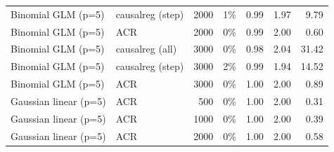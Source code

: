\begin{tabular}{llrrrrr}
Binomial GLM (p=5) & causalreg (step) & 2000 & 1\% & 0.99 & 1.97 & 9.79 \\
Binomial GLM (p=5) & ACR & 2000 & 0\% & 0.99 & 2.00 & 0.60 \\
Binomial GLM (p=5) & causalreg (all) & 3000 & 0\% & 0.98 & 2.04 & 31.42 \\
Binomial GLM (p=5) & causalreg (step) & 3000 & 2\% & 0.99 & 1.94 & 14.52 \\
Binomial GLM (p=5) & ACR & 3000 & 0\% & 1.00 & 2.00 & 0.89 \\
\midrule
Gaussian linear (p=5) & ACR & 500 & 0\% & 1.00 & 2.00 & 0.31 \\
Gaussian linear (p=5) & ACR & 1000 & 0\% & 1.00 & 2.00 & 0.39 \\
Gaussian linear (p=5) & ACR & 2000 & 0\% & 1.00 & 2.00 & 0.58 \\
\bottomrule
\end{tabular}
